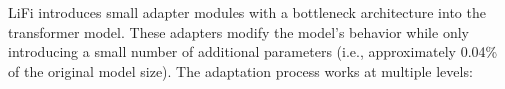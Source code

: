 % 
% 
% 
% 

LiFi \cite{shi2024lifilightweightcontrolledtext} introduces small adapter modules with a bottleneck architecture into the transformer model. 
These adapters modify the model's behavior while only introducing a small number of additional parameters (i.e., approximately 0.04\% of the original model size).
The adaptation process works at multiple levels:

